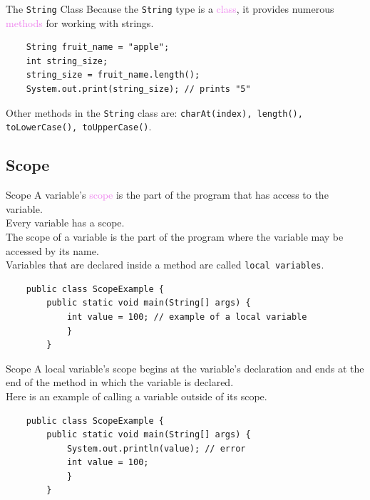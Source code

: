 \documentclass[11pt]{beamer}
\newcommand{\violet}[1]{\textcolor{violet}{#1}}
\begin{document}
\begin{frame}[fragile]{The \texttt{String} Class}
    Because the \texttt{String} type is a \violet{class}, it provides numerous \violet{methods} for working with strings.
    \begin{lstlisting}
    String fruit_name = "apple";
    int string_size;
    string_size = fruit_name.length();
    System.out.print(string_size); // prints "5"
    \end{lstlisting}
    Other methods in the \texttt{String} class are: \texttt{charAt(index), length(), toLowerCase(), toUpperCase()}.
\end{frame}

\subsection{Scope}
\begin{frame}[fragile]{Scope}
    A variable's \violet{scope} is the part of the program that has access to the variable. \\ \vspace{1em}
    Every variable has a scope. \\ \vspace{1em}
    The scope of a variable is the part of the program where the variable may be accessed by its name. \\ \vspace{1em}
    Variables that are declared inside a method are called \texttt{local variables}.
    \begin{lstlisting}
    public class ScopeExample {
        public static void main(String[] args) {
            int value = 100; // example of a local variable
            }
        }
    \end{lstlisting}
\end{frame}

\begin{frame}[fragile]{Scope}
    A local variable's scope begins at the variable's declaration and ends at the end of the method in which the variable is declared. \\ \vspace{1em}
    Here is an example of calling a variable outside of its scope.
    \begin{lstlisting}
    public class ScopeExample {
        public static void main(String[] args) {
            System.out.println(value); // error
            int value = 100;
            }
        }
    \end{lstlisting}
\end{frame}
\end{document}
